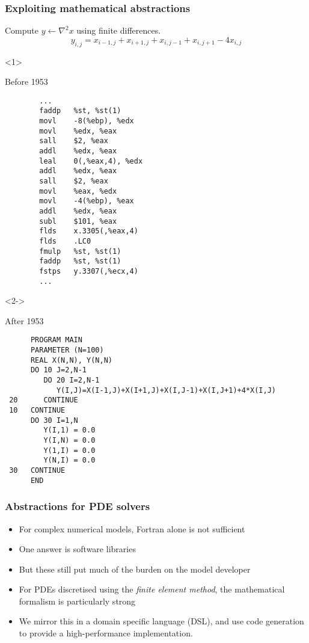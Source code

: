 \documentclass[presentation]{beamer}
\begin{document}
\begin{frame}[fragile]
  \frametitle{Exploiting mathematical abstractions}
  Compute $y \leftarrow \nabla^2 x$ using finite differences.
  \begin{equation*}
    y_{i,j} = x_{i-1, j} + x_{i+1, j} + x_{i, j-1} + x_{i, j+1} - 4x_{i,j}    
  \end{equation*}
  \begin{overlayarea}{\textwidth}{0.8\textheight}
  \begin{onlyenv}<1>
    \begin{block}{Before 1953}
\begin{verbatim}
        ...
        faddp   %st, %st(1)
        movl    -8(%ebp), %edx
        movl    %edx, %eax
        sall    $2, %eax
        addl    %edx, %eax
        leal    0(,%eax,4), %edx
        addl    %edx, %eax
        sall    $2, %eax
        movl    %eax, %edx
        movl    -4(%ebp), %eax
        addl    %edx, %eax
        subl    $101, %eax
        flds    x.3305(,%eax,4)
        flds    .LC0
        fmulp   %st, %st(1)
        faddp   %st, %st(1)
        fstps   y.3307(,%ecx,4)
        ...
\end{verbatim}
    \end{block}
  \end{onlyenv}
  \begin{onlyenv}<2->
    \begin{block}{After 1953}
\begin{verbatim}
      PROGRAM MAIN
      PARAMETER (N=100)
      REAL X(N,N), Y(N,N)
      DO 10 J=2,N-1
         DO 20 I=2,N-1
            Y(I,J)=X(I-1,J)+X(I+1,J)+X(I,J-1)+X(I,J+1)+4*X(I,J)
 20      CONTINUE
 10   CONTINUE
      DO 30 I=1,N
         Y(I,1) = 0.0
         Y(I,N) = 0.0
         Y(1,I) = 0.0
         Y(N,I) = 0.0
 30   CONTINUE
      END
\end{verbatim}
    \end{block}
  \end{onlyenv}
  \end{overlayarea}
\end{frame}

\begin{frame}
  \frametitle{Abstractions for PDE solvers}
  \begin{itemize}
  \item For complex numerical models, Fortran alone is not sufficient
  \item One answer is software libraries
  \item But these still put much of the burden on the model developer
  \item For PDEs discretised using the \emph{finite element method},
    the mathematical formalism is particularly strong
  \item We mirror this in a domain specific language (DSL), and
    use code generation to provide a high-performance implementation.
  \end{itemize}
\end{frame}
\end{document}
